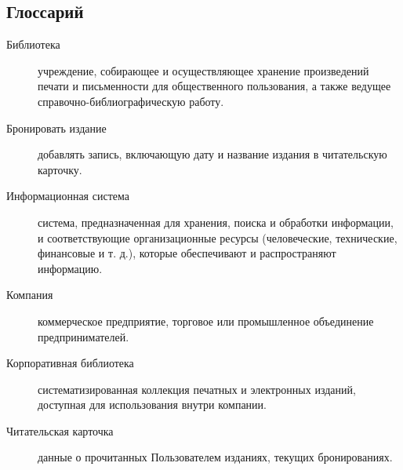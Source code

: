 \documentclass[./intro.tex]{subfiles}
\begin{document}
\subsection{Глоссарий}
\begin{description}
    \item[Библиотека] учреждение, собирающее и осуществляющее хранение произведений печати и письменности для общественного пользования, а также ведущее справочно-библиографическую работу.
    \item[Бронировать издание] добавлять запись, включающую дату и название издания в читательскую карточку.
    \item[Информационная система] система, предназначенная для хранения, поиска и обработки информации, и соответствующие организационные ресурсы (человеческие, технические, финансовые и т. д.), которые обеспечивают и распространяют информацию.
    \item[Компания] коммерческое предприятие, торговое или промышленное объединение предпринимателей.
    \item[Корпоративная библиотека] систематизированная коллекция печатных и электронных изданий, доступная для использования внутри компании.
    \item[Читательская карточка] данные о прочитанных Пользователем изданиях, текущих бронированиях.
\end{description}
\end{document}
